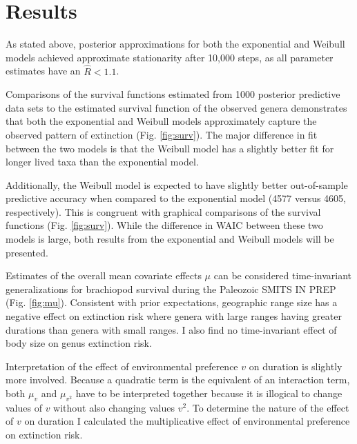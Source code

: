 \documentclass[12pt,letterpaper]{article}
\begin{document}
\section{Results}

As stated above, posterior approximations for both the exponential and Weibull models achieved approximate stationarity after 10,000 steps, as all parameter estimates have an \(\hat{R} < 1.1\).%

Comparisons of the survival functions estimated from 1000 posterior predictive data sets to the estimated survival function of the observed genera demonstrates that both the exponential and Weibull models approximately capture the observed pattern of extinction (Fig. \ref{fig:surv}). The major difference in fit between the two models is that the Weibull model has a slightly better fit for longer lived taxa than the exponential model.


Additionally, the Weibull model is expected to have slightly better out-of-sample predictive accuracy when compared to the exponential model (4577 versus 4605, respectively). This is congruent with graphical comparisons of the survival functions (Fig. \ref{fig:surv}). While the difference in WAIC between these two models is large, both results from the exponential and Weibull models will be presented.

Estimates of the overall mean covariate effects \(\mu\) can be considered time-invariant generalizations for brachiopod survival during the Paleozoic \uppercase{Smits in prep} (Fig. \ref{fig:mu}). Consistent with prior expectations, geographic range size has a negative effect on extinction risk where genera with large ranges having greater durations than genera with small ranges. I also find no time-invariant effect of body size on genus extinction risk. 

Interpretation of the effect of environmental preference \(v\) on duration is slightly more involved. Because a quadratic term is the equivalent of an interaction term, both \(\mu_{v}\) and \(\mu_{v^{2}}\) have to be interpreted together because it is illogical to change values of \(v\) without also changing values \(v^{2}\). To determine the nature of the effect of \(v\) on duration I calculated the multiplicative effect of environmental preference on extinction risk.
\end{document}
